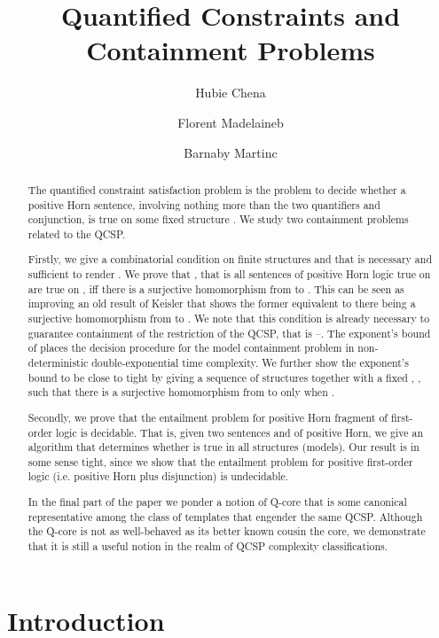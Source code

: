 \documentclass{LMCS}
\title[Quantified Constraints and Containment Problems]
        {Quantified Constraints and Containment Problems\rsuper*}
\author[H.~Chen]{Hubie Chen\rsuper a}
\author[F.~Madelaine]{Florent Madelaine\rsuper b}
\author[B.~Martin]{Barnaby Martin\rsuper c}
\begin{document}
\maketitle

\begin{abstract}
The quantified constraint satisfaction problem  is the problem to decide whether a positive Horn sentence, involving nothing more than the two quantifiers and conjunction, is true on some fixed structure . We study two containment problems related to the QCSP.

Firstly, we give a combinatorial condition on finite structures  and  that is necessary and sufficient to render .  We prove that , that is all sentences of positive Horn logic true on  are true on , iff there is a surjective homomorphism from  to . This can be seen as improving an old result of Keisler that shows the former equivalent to there being a surjective homomorphism from  to .  We note that this condition is already necessary to guarantee containment of the  restriction of the QCSP, that is --. 
The exponent's bound of  places the decision procedure for the model containment problem in non-deterministic double-exponential time complexity. We further show the exponent's bound  to be close to tight by giving a sequence of structures  together with a fixed , , such that there is a surjective homomorphism from  to  only when .

Secondly, we prove that the entailment problem for positive Horn fragment of first-order logic is decidable. That is, given two sentences  and  of positive Horn,  we give an algorithm that determines whether  is true in all structures (models). Our result is in some sense tight, since we show that the entailment problem for positive first-order logic (\mbox{i.e.} positive Horn plus disjunction) is undecidable.

In the final part of the paper we ponder a notion of Q-core that is some canonical representative among the class of templates that engender the same QCSP. Although the Q-core is not as well-behaved as its better known cousin the core, we demonstrate that it is still a useful notion in the realm of QCSP complexity classifications.
\end{abstract}

\section{Introduction}
\end{document}
